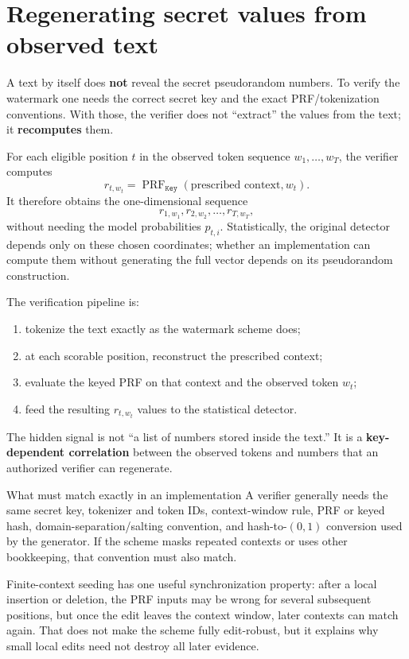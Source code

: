 \documentclass[11pt]{article}
\DeclareRobustCommand{\iperpaper}[2]{%
  \begingroup
  \hypersetup{pdfborder=0 0 0}%
  \href{iperpaper:#1}{{\color{iperpaperlink}#2}}%
  \endgroup
}
\def\iperpaper#1#2{#2}%
\newcommand{\Key}{\mathtt{Key}}
\newcommand{\PRF}{\operatorname{PRF}}
\begin{document}
\section{Regenerating secret values from observed text}

A text by itself does \textbf{not} reveal the secret pseudorandom numbers. To verify the watermark one needs the correct secret key and the exact \iperpaper{prf_name}{PRF}/tokenization conventions. With those, the verifier does not ``extract'' the values from the text; it \textbf{recomputes} them.

For each eligible position $t$ in the observed token sequence $w_1,\ldots,w_T$, the verifier computes
\[
  r_{t,w_t}=\iperpaper{prf_symbol}{\PRF}_{\Key}(\text{prescribed context},w_t).
\]
It therefore obtains the one-dimensional sequence
\[
  r_{1,w_1},r_{2,w_2},\ldots,r_{T,w_T},
\]
without needing the model probabilities $p_{t,i}$. Statistically, the original detector depends only on these chosen coordinates; whether an implementation can compute them without generating the full vector depends on its pseudorandom construction.

The verification pipeline is:
\begin{enumerate}
\item tokenize the text exactly as the watermark scheme does;
\item at each scorable position, reconstruct the prescribed context;
\item evaluate the keyed \iperpaper{prf_name}{PRF} on that context and the observed token $w_t$;
\item feed the resulting $r_{t,w_t}$ values to the statistical detector.
\end{enumerate}

\begin{keybox}
The hidden signal is not ``a list of numbers stored inside the text.'' It is a \textbf{key-dependent correlation} between the observed tokens and numbers that an authorized verifier can regenerate.
\end{keybox}

\begin{leveltwo}{What must match exactly in an implementation}
A verifier generally needs the same secret key, tokenizer and token IDs, context-window rule, \iperpaper{prf_name}{PRF} or keyed hash, domain-separation/salting convention, and hash-to-$(0,1)$ conversion used by the generator. If the scheme masks repeated contexts or uses other bookkeeping, that convention must also match.

Finite-context seeding has one useful synchronization property: after a local insertion or deletion, the \iperpaper{prf_name}{PRF} inputs may be wrong for several subsequent positions, but once the edit leaves the context window, later contexts can match again. That does not make the scheme fully edit-robust, but it explains why small local edits need not destroy all later evidence.

\end{leveltwo}
\end{document}
